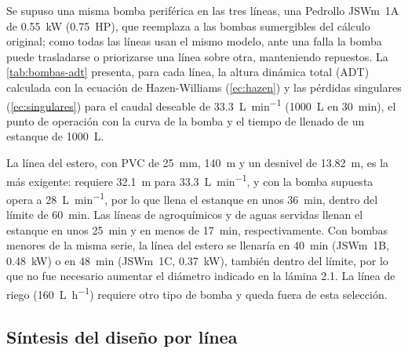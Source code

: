 Se supuso una misma bomba periférica en las tres líneas, una Pedrollo JSWm~1A de \qty{0.55}{\kilo\watt} (\qty{0.75}{HP}), que reemplaza a las bombas sumergibles del cálculo original; como todas las líneas usan el mismo modelo, ante una falla la bomba puede trasladarse o priorizarse una línea sobre otra, manteniendo repuestos.
La \cref{tab:bombas-adt} presenta, para cada línea, la altura dinámica total (ADT) calculada con la ecuación de Hazen-Williams (\cref{ec:hazen}) y las pérdidas singulares (\cref{ec:singulares}) para el caudal deseable de \qty{33.3}{\liter\per\minute} (\qty{1000}{\liter} en \qty{30}{\minute}), el punto de operación con la curva de la bomba y el tiempo de llenado de un estanque de \qty{1000}{\liter}.

\begin{table}[htbp]
  \centering
  \caption{Impulsión por línea: altura dinámica total, punto de operación con la bomba Pedrollo JSWm~1A y tiempo de llenado de \qty{1000}{\liter}. Fuente: elaboración propia.}
  \label{tab:bombas-adt}
  {\small}
\end{table}

La línea del estero, con PVC de \qty{25}{\milli\meter}, \qty{140}{\meter} y un desnivel de \qty{13.82}{\meter}, es la más exigente: requiere \qty{32.1}{\meter} para \qty{33.3}{\liter\per\minute}, y con la bomba supuesta opera a \qty{28}{\liter\per\minute}, por lo que llena el estanque en unos \qty{36}{\minute}, dentro del límite de \qty{60}{\minute}.
Las líneas de agroquímicos y de aguas servidas llenan el estanque en unos \qty{25}{\minute} y en menos de \qty{17}{\minute}, respectivamente.
Con bombas menores de la misma serie, la línea del estero se llenaría en \qty{40}{\minute} (JSWm~1B, \qty{0.48}{\kilo\watt}) o en \qty{48}{\minute} (JSWm~1C, \qty{0.37}{\kilo\watt}), también dentro del límite, por lo que no fue necesario aumentar el diámetro indicado en la lámina 2.1.
La línea de riego (\qty{160}{\liter\per\hour}) requiere otro tipo de bomba y queda fuera de esta selección.

\subsection{Síntesis del diseño por línea}

